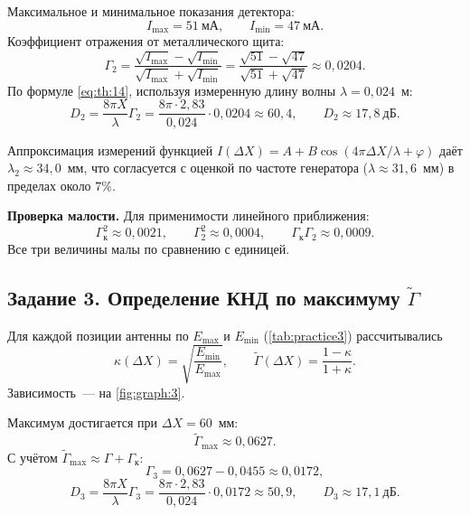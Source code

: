 Максимальное и минимальное показания детектора:
\begin{equation}
	I_{\max} = 51~\text{мА}, \qquad I_{\min} = 47~\text{мА}.
\end{equation}
Коэффициент отражения от металлического щита:
\begin{equation}
	\Gamma_2 = \frac{\sqrt{I_{\max}} - \sqrt{I_{\min}}}{\sqrt{I_{\max}} + \sqrt{I_{\min}}}
	= \frac{\sqrt{51} - \sqrt{47}}{\sqrt{51} + \sqrt{47}}
	\approx 0{,}0204.
	\label{eq:pr:2.1}
\end{equation}
По формуле \cref{eq:th:14}, используя измеренную длину волны $\lambda = 0{,}024$~м:
\begin{equation}
	D_2 = \frac{8\pi X}{\lambda}\Gamma_2
	= \frac{8\pi \cdot 2{,}83}{0{,}024} \cdot 0{,}0204
	\approx 60{,}4,
	\qquad
	D_2 \approx 17{,}8~\text{дБ}.
\end{equation}

Аппроксимация измерений функцией $I(\Delta X) = A + B\cos(4\pi\Delta X/\lambda + \varphi)$ даёт $\lambda_2 \approx 34{,}0$~мм, что согласуется с оценкой по частоте генератора ($\lambda \approx 31{,}6$~мм) в пределах около $7\%$.

\noindent\textbf{Проверка малости.}
Для применимости линейного приближения:
\begin{equation}
	\Gamma_{\text{к}}^2 \approx 0{,}0021, \qquad
	\Gamma_2^2 \approx 0{,}0004, \qquad
	\Gamma_{\text{к}}\Gamma_2 \approx 0{,}0009.
\end{equation}
Все три величины малы по сравнению с единицей.

\subsection{Задание 3. Определение КНД по максимуму $\widetilde{\Gamma}$}

Для каждой позиции антенны по $E_{\max}$ и $E_{\min}$ (\cref{tab:practice3}) рассчитывались
\begin{equation}
	\kappa(\Delta X) = \sqrt{\frac{E_{\min}}{E_{\max}}},
	\qquad
	\widetilde{\Gamma}(\Delta X) = \frac{1 - \kappa}{1 + \kappa}.
\end{equation}
Зависимость~--- на \cref{fig:graph:3}.

Максимум достигается при $\Delta X = 60$~мм:
\begin{equation}
	\widetilde{\Gamma}_{\max} \approx 0{,}0627.
\end{equation}
С учётом $\widetilde{\Gamma}_{\max} \approx \Gamma + \Gamma_{\text{к}}$:
\begin{equation}
	\Gamma_3 = 0{,}0627 - 0{,}0455 \approx 0{,}0172,
\end{equation}
\begin{equation}
	D_3 = \frac{8\pi X}{\lambda}\Gamma_3
	= \frac{8\pi \cdot 2{,}83}{0{,}024} \cdot 0{,}0172
	\approx 50{,}9,
	\qquad
	D_3 \approx 17{,}1~\text{дБ}.
\end{equation}

